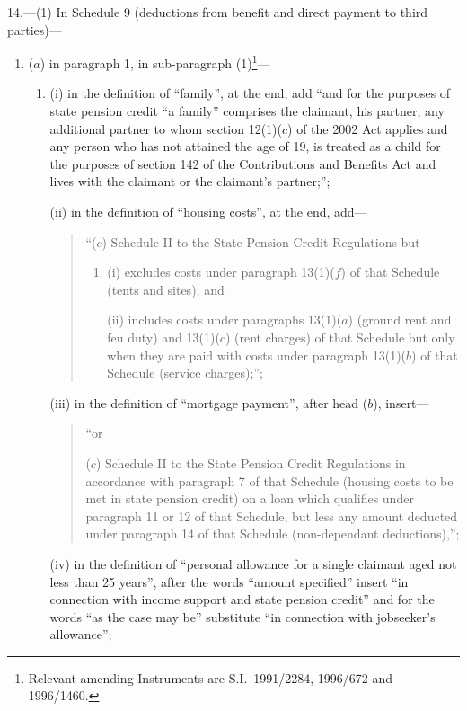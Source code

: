 \documentclass[12pt,a4paper]{article}
\begin{document}
14.---(1)  In Schedule 9 (deductions from benefit and direct payment to third parties)—
\begin{enumerate}\item[]
($a$) in paragraph 1, in sub-paragraph (1)\footnote{Relevant amending Instruments are S.I.\ 1991/2284, 1996/672 and 1996/1460.}—
\begin{enumerate}\item[]
(i) in the definition of “family”, at the end, add “and for the purposes of state pension credit “a family” comprises the claimant, his partner, any additional partner to whom section 12(1)($c$)  of the 2002 Act applies and any person who has not attained the age of 19, is treated as a child for the purposes of section 142 of the Contributions and Benefits Act and lives with the claimant or the claimant’s partner;”;

(ii) in the definition of “housing costs”, at the end, add—
\begin{quotation}
“($c$) Schedule II to the State Pension Credit Regulations but—
\begin{enumerate}\item[]
(i) excludes costs under paragraph 13(1)($f$)  of that Schedule (tents and sites); and

(ii) includes costs under paragraphs 13(1)($a$)  (ground rent and feu duty) and 13(1)($c$)  (rent charges) of that Schedule but only when they are paid with costs under paragraph 13(1)($b$)  of that Schedule (service charges);”;
\end{enumerate}
\end{quotation}

(iii) in the definition of “mortgage payment”, after head ($b$), insert—
\begin{quotation}
    “or

    ($c$) 
    Schedule II to the State Pension Credit Regulations in accordance with paragraph 7 of that Schedule (housing costs to be met in state pension credit) on a loan which qualifies under paragraph 11 or 12 of that Schedule, but less any amount deducted under paragraph 14 of that Schedule (non-dependant deductions),”; 
\end{quotation}

(iv) in the definition of “personal allowance for a single claimant aged not less than 25 years”, after the words “amount specified” insert “in connection with income support and state pension credit” and for the words “as the case may be” substitute “in connection with jobseeker’s allowance”;


\end{enumerate}
\end{enumerate}
\end{document}
